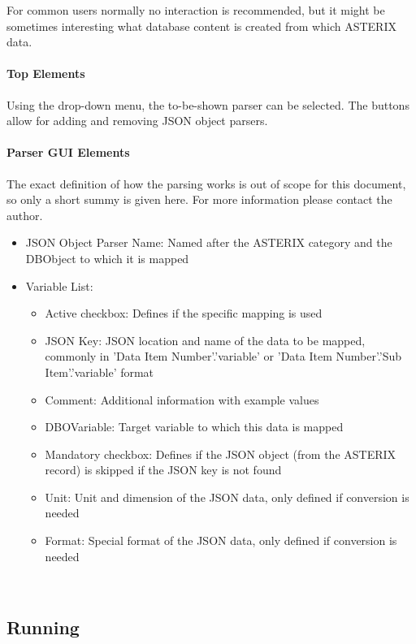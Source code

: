 For common users normally no interaction is recommended, but it might be sometimes interesting what database content is created from which ASTERIX data.

\paragraph{Top Elements}

Using the drop-down menu, the to-be-shown parser can be selected. The buttons allow for adding and removing JSON object parsers.

\paragraph{Parser GUI Elements}

The exact definition of how the parsing works is out of scope for this document, so only a short summy is given here. For more information please contact the author.


\begin{itemize}  
\item JSON Object Parser Name: Named after the ASTERIX category and the DBObject to which it is mapped
\item Variable List:
\begin{itemize}  
\item Active checkbox: Defines if the specific mapping is used
\item JSON Key: JSON location and name of the data to be mapped, commonly in 'Data Item Number'.'variable' or 'Data Item Number'.'Sub Item'.'variable' format
\item Comment: Additional information with example values
\item DBOVariable: Target variable to which this data is mapped
\item Mandatory checkbox: Defines if the JSON object (from the ASTERIX record) is skipped if the JSON key is not found
\item Unit: Unit and dimension of the JSON data, only defined if conversion is needed
\item Format: Special format of the JSON data, only defined if conversion is needed
\end{itemize}
\end{itemize}
\ \\

\subsection{Running}

